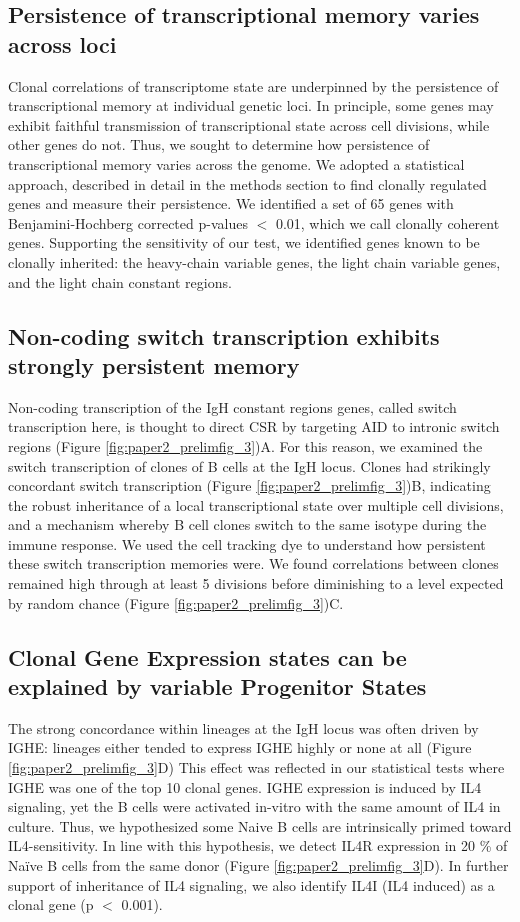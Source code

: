 \subsection{Persistence of transcriptional memory varies across loci}
Clonal correlations of transcriptome state are underpinned by the persistence of transcriptional memory at individual genetic loci. In principle, some genes may exhibit faithful transmission of transcriptional state across cell divisions, while other genes do not. Thus, we sought to determine how persistence of transcriptional memory varies across the genome.
We adopted a statistical approach, described in detail in the methods section to find clonally regulated genes and measure their persistence. We identified a set of 65 genes with Benjamini-Hochberg corrected p-values $<$ 0.01, which we call clonally coherent genes. Supporting the sensitivity of our test, we identified genes known to be clonally inherited: the heavy-chain variable genes, the light chain variable genes, and the light chain constant regions. 

\subsection{Non-coding switch transcription exhibits strongly persistent memory}

Non-coding transcription of the IgH constant regions genes, called switch transcription here, is thought to direct CSR by targeting AID to intronic switch regions  (Figure \ref{fig:paper2_prelimfig_3})A\cite{stavnezer_igh_2014}. For this reason, we examined the switch transcription of clones of B cells at the IgH locus. Clones had strikingly concordant switch transcription  (Figure \ref{fig:paper2_prelimfig_3})B, indicating the robust inheritance of a local transcriptional state over multiple cell divisions, and a mechanism whereby B cell clones switch to the same isotype during the immune response. We used the cell tracking dye to understand how persistent these switch transcription memories were. We found correlations between clones remained high through at least 5 divisions before diminishing to a level expected by random chance  (Figure \ref{fig:paper2_prelimfig_3})C.

\subsection{Clonal Gene Expression states can be explained by variable Progenitor States}
The strong concordance within lineages at the IgH locus was often driven by IGHE: lineages either tended to express IGHE highly or none at all  (Figure \ref{fig:paper2_prelimfig_3}D) This effect was reflected in our statistical tests where IGHE was one of the top 10 clonal genes. IGHE expression is induced by IL4 signaling, yet the B cells were activated in-vitro with the same amount of IL4 in culture. Thus, we hypothesized some Naive B cells are intrinsically primed toward IL4-sensitivity. In line with this hypothesis, we detect IL4R expression in 20 \% of Naïve B cells from the same donor (Figure \ref{fig:paper2_prelimfig_3}D). In further support of inheritance of IL4 signaling, we also identify IL4I (IL4 induced) as a clonal gene (p $<$ 0.001).

